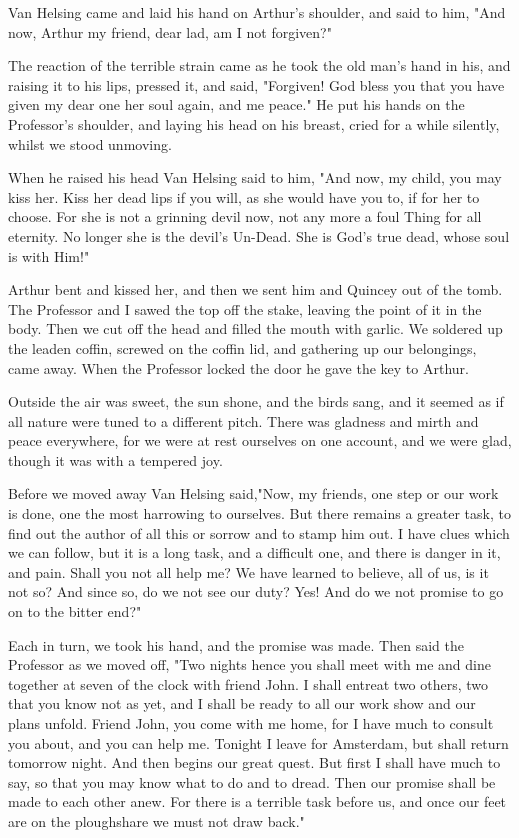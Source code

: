 Van Helsing came and laid his hand on Arthur's shoulder, and said to him, "And now, Arthur my friend, dear lad, am I not forgiven?" 

The reaction of the terrible strain came as he took the old man's hand in his, and raising it to his lips, pressed it, and said, "Forgiven! God bless you that you have given my dear one her soul again, and me peace." He put his hands on the Professor's shoulder, and laying his head on his breast, cried for a while silently, whilst we stood unmoving. 

When he raised his head Van Helsing said to him, "And now, my child, you may kiss her. Kiss her dead lips if you will, as she would have you to, if for her to choose. For she is not a grinning devil now, not any more a foul Thing for all eternity. No longer she is the devil's Un-Dead. She is God's true dead, whose soul is with Him!" 

Arthur bent and kissed her, and then we sent him and Quincey out of the tomb. The Professor and I sawed the top off the stake, leaving the point of it in the body. Then we cut off the head and filled the mouth with garlic. We soldered up the leaden coffin, screwed on the coffin lid, and gathering up our belongings, came away. When the Professor locked the door he gave the key to Arthur. 

Outside the air was sweet, the sun shone, and the birds sang, and it seemed as if all nature were tuned to a different pitch. There was gladness and mirth and peace everywhere, for we were at rest ourselves on one account, and we were glad, though it was with a tempered joy. 

Before we moved away Van Helsing said,"Now, my friends, one step or our work is done, one the most harrowing to ourselves. But there remains a greater task, to find out the author of all this or sorrow and to stamp him out. I have clues which we can follow, but it is a long task, and a difficult one, and there is danger in it, and pain. Shall you not all help me? We have learned to believe, all of us, is it not so? And since so, do we not see our duty? Yes! And do we not promise to go on to the bitter end?" 

Each in turn, we took his hand, and the promise was made. Then said the Professor as we moved off, "Two nights hence you shall meet with me and dine together at seven of the clock with friend John. I shall entreat two others, two that you know not as yet, and I shall be ready to all our work show and our plans unfold. Friend John, you come with me home, for I have much to consult you about, and you can help me. Tonight I leave for Amsterdam, but shall return tomorrow night. And then begins our great quest. But first I shall have much to say, so that you may know what to do and to dread. Then our promise shall be made to each other anew. For there is a terrible task before us, and once our feet are on the ploughshare we must not draw back." 
